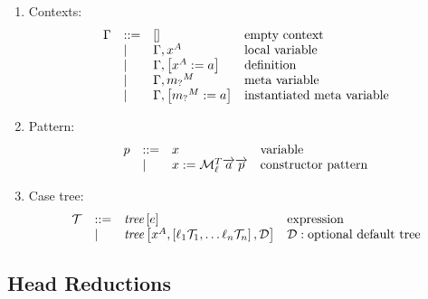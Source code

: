 \begin{enumerate}
    \item Contexts:
        $$
        \begin{array}{lllll} 
            \Gamma
            &::=&
            []
            &\text{empty context}
            \\
            &\mid&
            \Gamma, x^A
            &\text{local variable}
            \\
            &\mid&
            \Gamma, \left[ {x^A := a} \right]
            &\text{definition}
            \\
            &\mid&
            \Gamma, {m_?}^M
            &\text{meta variable}
            \\
            &\mid&
            \Gamma, \left[ {{m_?}^M := a} \right]
            &\text{instantiated meta variable}
         \end{array}
        $$

    \item Pattern:
        $$
        \begin{array}{lllll} 
            p &::=& x & \text{variable}
            \\
            &\mid& x := {\cal M}^T_\ell {\overrightarrow {a}} {\overrightarrow {p}}
            & \text{constructor pattern}
         \end{array}
        $$


    \item Case tree:
        $$
        \begin{array}{lllll} 
            {\mathcal T}
            &::=&
            {{\text{\it tree}}\left[ {e} \right]} & \text{expression}
            \\
            &\mid&
            {{\text{\it tree}}\left[ {
                x^A,
                \left[ {\ell_1 {{\mathcal T}}_1, \ldots \ell_n {{\mathcal T}}_n} \right],
                {\mathcal D}
            } \right]}
            & {\mathcal D}: \text{optional default tree}
         \end{array}
        $$
\end{enumerate}





\subsection{Head Reductions}

